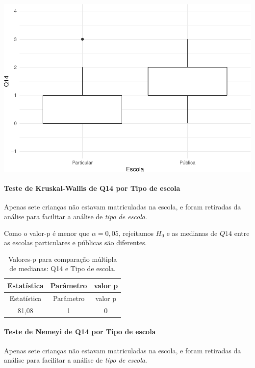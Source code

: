 \documentclass[]{article}
\let\oldparagraph\paragraph
\renewcommand{\paragraph}[1]{\oldparagraph{#1}\mbox{}}
\begin{document}
\begin{center}\includegraphics[width=0.75\linewidth]{relatorio_files/figure-latex/unnamed-chunk-92-1} \end{center}

\hypertarget{teste-de-kruskal-wallis-de-q14-por-tipo-de-escola}{%
\paragraph{Teste de Kruskal-Wallis de Q14 por Tipo de escola}\label{teste-de-kruskal-wallis-de-q14-por-tipo-de-escola}}

Apenas sete crianças não estavam matriculadas na escola, e foram retiradas da análise para facilitar a análise de \emph{tipo de escola}.

Como o valor-p é menor que \(\alpha=0,05\), rejeitamos \(H_0\) e as medianas de \(Q14\) entre as escolas particulares e públicas são diferentes.

\begin{longtable}[]{@{}ccc@{}}
\caption{\label{tab:unnamed-chunk-93}Valores-p para comparação múltipla de medianas: Q14 e Tipo de escola.}\tabularnewline
\toprule
Estatística & Parâmetro & valor p\tabularnewline
\midrule
\endfirsthead
\toprule
Estatística & Parâmetro & valor p\tabularnewline
\midrule
\endhead
81,08 & 1 & 0\tabularnewline
\bottomrule
\end{longtable}

\hypertarget{teste-de-nemeyi-de-q14-por-tipo-de-escola}{%
\paragraph{Teste de Nemeyi de Q14 por Tipo de escola}\label{teste-de-nemeyi-de-q14-por-tipo-de-escola}}

Apenas sete crianças não estavam matriculadas na escola, e foram retiradas da análise para facilitar a análise de \emph{tipo de escola}.
\end{document}

